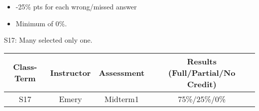 \begin{rubric}

\begin{itemize}
	\item -25\% pts for each wrong/missed answer
	\item Minimum of 0\%.
\end{itemize}

\end{rubric}

\begin{outcomes}

S17: Many selected only one.

\begin{center}
	\begin{tabular}{cccc}
		\hline\hline
                Class-Term & Instructor & Assessment & Results (Full/Partial/No Credit) \\
		\hline
                S17 & Emery & Midterm1 & 75\%/25\%/0\%\\
		\hline
	\end{tabular}
\end{center}
\end{outcomes}

\begin{comments}

	
\end{comments}

